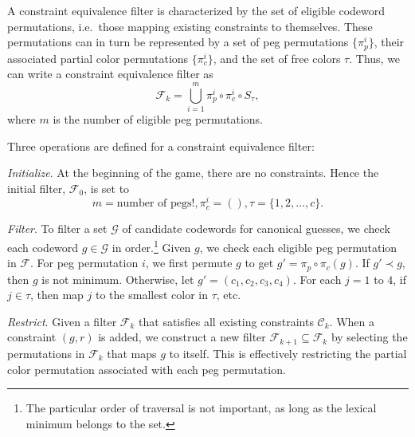 
A constraint equivalence filter is characterized by the set of eligible codeword permutations, i.e.\ those mapping existing constraints to themselves. These permutations 
can in turn be represented by a set of peg permutations $\{\pi_p^i\}$, their associated partial color permutations $\{\pi_c^i\}$, and the set of free colors $\tau$. Thus, we can write a constraint equivalence filter as
\[
\mathcal{F}_k = \bigcup_{i=1}^m \pi_p^i \circ \pi_c^i \circ S_\tau ,
\]
where $m$ is the number of eligible peg permutations.

Three operations are defined for a constraint equivalence filter:

\emph{Initialize}. At the beginning of the game, there are no constraints. Hence the initial filter, $\mathcal{F}_0$, is set to 
\[
m = \text{number of pegs}!, \pi_c^i = (), \tau = \{1, 2, \ldots, c \}.
\]

\emph{Filter}. To filter a set $\mathcal{G}$ of candidate codewords for canonical guesses, we check each codeword $g \in \mathcal{G}$ in order.\footnote{The particular order of traversal is not important, as long as the lexical minimum belongs to the set.} 
Given $g$, we check each eligible peg permutation in $\mathcal{F}$. For peg permutation $i$, we first permute $g$ to get $g' = \pi_p \circ \pi_c (g)$. If $g' \prec g$, then $g$ is not minimum. Otherwise, let $g' = (c_1, c_2, c_3, c_4)$. For each $j = 1$ to $4$, if $j \in \tau$, then map $j$ to the smallest color in $\tau$, etc.



\emph{Restrict}. Given a filter $\mathcal{F}_k$ that satisfies all existing constraints $\mathcal{C}_k$. When a constraint $(g, r)$ is added, we construct a new filter $\mathcal{F}_{k+1} \subseteq \mathcal{F}_k$ by selecting the permutations in $\mathcal{F}_k$ that maps $g$ to itself. This is effectively restricting the partial color permutation associated with each peg permutation.

